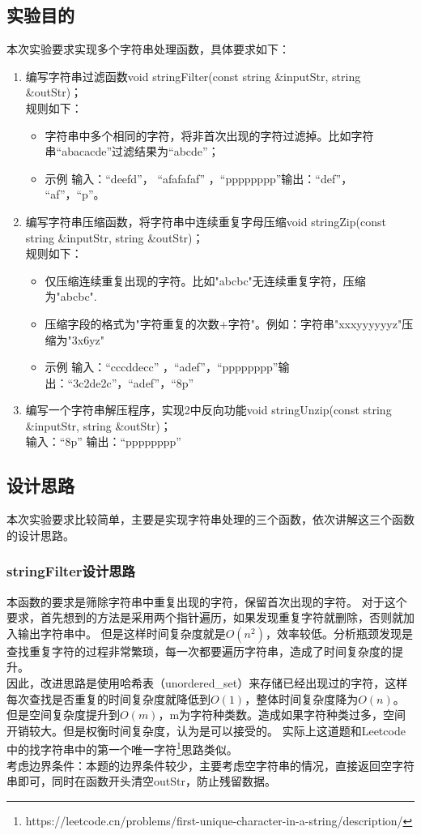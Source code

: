 \documentclass[dvipsnames, svgnames,a4paper,11pt]{article}
\begin{document}
\subsection{实验目的}
\begin{question}
本次实验要求实现多个字符串处理函数，具体要求如下：
\begin{enumerate}
    \item 编写字符串过滤函数void stringFilter(const string \&inputStr, string \&outStr)；\\
    规则如下：
    \begin{itemize}
        \item  字符串中多个相同的字符，将非首次出现的字符过滤掉。比如字符串“abacacde”过滤结果为“abcde”；
        \item 示例 输入：“deefd”， “afafafaf” ，“pppppppp”输出：“def”， “af”，“p”。
    \end{itemize}
    \item 编写字符串压缩函数，将字符串中连续重复字母压缩void stringZip(const string \&inputStr, string \&outStr)；\\
    规则如下：
    \begin{itemize}
        \item 仅压缩连续重复出现的字符。比如"abcbc"无连续重复字符，压缩为"abcbc".
        \item 压缩字段的格式为"字符重复的次数+字符"。例如：字符串"xxxyyyyyyz"压缩为"3x6yz"
        \item 示例 输入：“cccddecc” ，“adef”，“pppppppp”输出：“3c2de2c”，“adef”，“8p”
    \end{itemize}
    \item 编写一个字符串解压程序，实现2中反向功能void stringUnzip(const string \&inputStr, string \&outStr)；\\
    输入：“8p” 输出：“pppppppp”       
\end{enumerate}
\end{question}
\subsection{设计思路}
本次实验要求比较简单，主要是实现字符串处理的三个函数，依次讲解这三个函数的设计思路。
\subsubsection{stringFilter设计思路}
本函数的要求是筛除字符串中重复出现的字符，保留首次出现的字符。
对于这个要求，首先想到的方法是采用两个指针遍历，如果发现重复字符就删除，否则就加入输出字符串中。
但是这样时间复杂度就是$O(n^2)$，效率较低。分析瓶颈发现是查找重复字符的过程非常繁琐，每一次都要遍历字符串，造成了时间复杂度的提升。\\
因此，改进思路是使用哈希表（unordered\_set）来存储已经出现过的字符，这样每次查找是否重复的时间复杂度就降低到$O(1)$，整体时间复杂度降为$O(n)$。
但是空间复杂度提升到$O(m)$，m为字符种类数。造成如果字符种类过多，空间开销较大。但是权衡时间复杂度，认为是可以接受的。
实际上这道题和Leetcode中的找字符串中的第一个唯一字符\footnote{https://leetcode.cn/problems/first-unique-character-in-a-string/description/}思路类似。\\
考虑边界条件：本题的边界条件较少，主要考虑空字符串的情况，直接返回空字符串即可，同时在函数开头清空outStr，防止残留数据。
\end{document}
